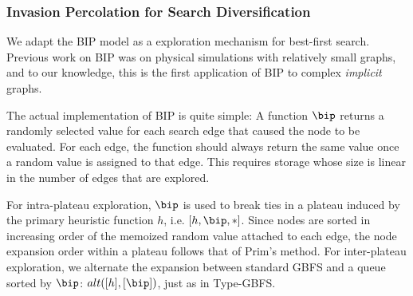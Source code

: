 \subsubsection{Invasion Percolation for Search Diversification}
We adapt the BIP model as a exploration mechanism for best-first search.
Previous work on BIP was on physical simulations with relatively small graphs, 
and to our knowledge, this is the first application of BIP  to complex \emph{implicit} graphs.


The actual implementation of BIP is quite simple:
A %
function $\bip$ returns a randomly selected value 
for each search edge that caused the node to be evaluated.
For each edge, the function should always return the same value  once a random value is assigned to that edge. This requires storage whose size is linear in the number of edges that are explored.


For intra-plateau exploration, $\bip$ is used to break ties in a plateau induced by the primary heuristic function $h$, i.e. $[h,\bip,*]$.
Since nodes are sorted in increasing order of the memoized random value attached to each edge, the node expansion order within a plateau follows that of Prim's method.
For inter-plateau exploration, we alternate the expansion between standard GBFS and a queue sorted by $\bip$: $\mit{alt}([h],[\bip])$, just as in Type-GBFS.


